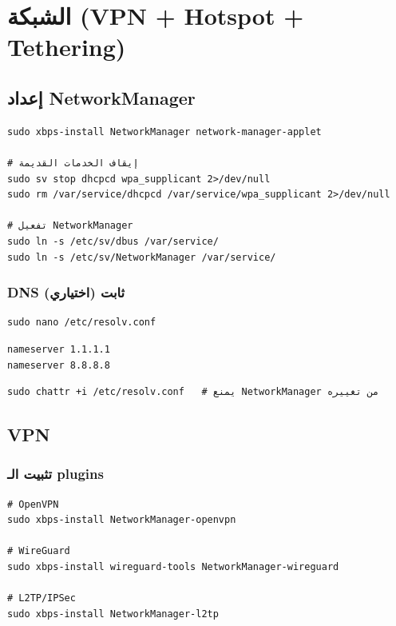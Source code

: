 \documentclass[12pt, a4paper]{report}
\begin{document}
\chapter{الشبكة (VPN + Hotspot + Tethering)}

\section{إعداد NetworkManager}
\begin{lstlisting}
sudo xbps-install NetworkManager network-manager-applet

# إيقاف الخدمات القديمة
sudo sv stop dhcpcd wpa_supplicant 2>/dev/null
sudo rm /var/service/dhcpcd /var/service/wpa_supplicant 2>/dev/null

# تفعيل NetworkManager
sudo ln -s /etc/sv/dbus /var/service/
sudo ln -s /etc/sv/NetworkManager /var/service/
\end{lstlisting}

\subsection{DNS ثابت (اختياري)}
\begin{lstlisting}
sudo nano /etc/resolv.conf
\end{lstlisting}
\begin{lstlisting}[style=inistyle]
nameserver 1.1.1.1
nameserver 8.8.8.8
\end{lstlisting}
\begin{lstlisting}
sudo chattr +i /etc/resolv.conf   # يمنع NetworkManager من تغييره
\end{lstlisting}

\section{VPN}

\subsection{تثبيت الـ plugins}
\begin{lstlisting}
# OpenVPN
sudo xbps-install NetworkManager-openvpn

# WireGuard
sudo xbps-install wireguard-tools NetworkManager-wireguard

# L2TP/IPSec
sudo xbps-install NetworkManager-l2tp
\end{lstlisting}
\end{document}
